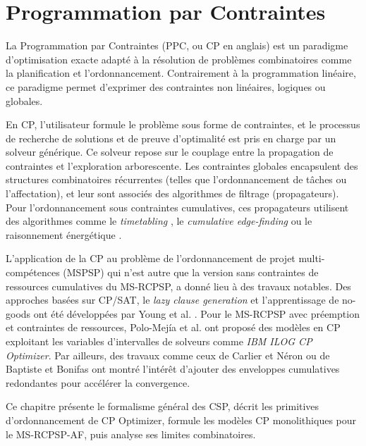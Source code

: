 \section{Programmation par Contraintes}

La Programmation par Contraintes (PPC, ou CP en anglais) est un paradigme d'optimisation exacte adapté à la résolution de problèmes combinatoires comme la planification et l'ordonnancement. Contrairement à la programmation linéaire, ce paradigme permet d'exprimer des contraintes non linéaires, logiques ou globales.

\bigskip

En CP, l'utilisateur formule le problème sous forme de contraintes, et le processus de recherche de solutions et de preuve d'optimalité est pris en charge par un solveur générique. Ce solveur repose sur le couplage entre la propagation de contraintes et l'exploration arborescente. Les contraintes globales encapsulent des structures combinatoires récurrentes (telles que l'ordonnancement de tâches ou l'affectation), et leur sont associés des algorithmes de filtrage (propagateurs). Pour l'ordonnancement sous contraintes cumulatives, ces propagateurs utilisent des algorithmes comme le \textit{timetabling} \cite{fahimi2014linear}, le \textit{cumulative edge-finding} \cite{vilim2009edge} ou le raisonnement énergétique \cite{ouellet2018checker}.

\bigskip

L'application de la CP au problème de l'ordonnancement de projet multi-compétences (MSPSP) qui n'est autre que la version sans contraintes de ressources cumulatives du MS-RCPSP, a donné lieu à des travaux notables. Des approches basées sur CP/SAT, le \textit{lazy clause generation} et l'apprentissage de no-goods ont été développées par Young et al. \cite{young2017constraint}. Pour le MS-RCPSP avec préemption et contraintes de ressources, Polo-Mejía et al. \cite{polo2020mixed, polo2023heuristic} ont proposé des modèles en CP exploitant les variables d'intervalles de solveurs comme \textit{IBM ILOG CP Optimizer}. Par ailleurs, des travaux comme ceux de Carlier et Néron \cite{carlier2007computing} ou de Baptiste et Bonifas \cite{baptiste2018redundant} ont montré l'intérêt d'ajouter des enveloppes cumulatives redondantes pour accélérer la convergence.

\bigskip

Ce chapitre présente le formalisme général des CSP, décrit les primitives d'ordonnancement de CP Optimizer, formule les modèles CP monolithiques pour le MS-RCPSP-AF, puis analyse ses limites combinatoires.

